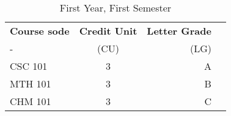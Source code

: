 \documentclass{article}
\begin{document}
\begin{table}

	\centering
	\caption{First Year, First Semester}
	\label{tab:table1}
	\begin{tabular}{l|c|r|c}
		\textbf{Course sode}&\textbf{Credit Unit}&\textbf{Letter Grade}\\
		-&(CU)&(LG) \\
		\hline
		CSC 101 &3&A\\
		MTH 101 &3&B\\
		CHM 101 &3&C\\
		
	\end{tabular}
\end{table}
\end{document}
